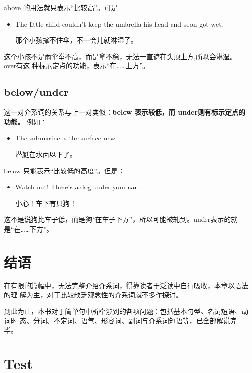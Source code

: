 \documentclass{yufa}
\newcommand\unbf[1]{\CJKunderline[thickness=0.8pt, textformat=\bfseries]{#1}}
\begin{document}
above 的用法就只表示“比较高”。可是
\begin{itemize}
\item The little child couldn't keep the umbrella \unbf{over} his head and soon got
  wet.

  那个小孩撑不住伞，不一会儿就淋湿了。
\end{itemize}
这个小孩不是雨伞举不高，而是拿不稳，无法一直遮在头顶上方,所以会淋湿。over有这
种标示定点的功能，表示“在……上方”。

\subsection{below/under}

这一对介系词的关系与上一对类似：\textbf{below 表示较低，而 under则有标示定点的功能。}
例如：
\begin{itemize}
\item  The submarine is \unbf{below} the surface now.

  潜艇在水面以下了。
\end{itemize}

below 只能表示“比较低的高度”。但是：
\begin{itemize}
\item  Watch out! There's a dog under your car.

  小心！车下有只狗！
\end{itemize}
这不是说狗比车子低，而是狗“在车子下方”，所以可能被轧到。under表示的就
是“在……下方”。

\section{结语}

在有限的篇幅中，无法完整介绍介系词，得靠读者于泛读中自行吸收，本章以语法的理
解为主，对于比较缺乏观念性的介系词就不多作探讨。

到此为止，本书对于简单句中所牵涉到的各项问题：包括基本句型、名词短语、动词时
态、分词、不定词、语气、形容词、副词与介系词短语等，已全部解说完毕。

\section{Test}
\end{document}
